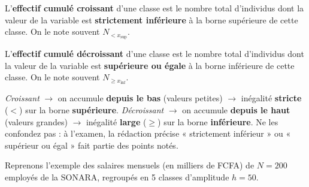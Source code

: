 \documentclass[11pt]{article}
\begin{document}
\begin{definition}
L'\textbf{effectif cumulé croissant} d'une classe est le nombre total d'individus dont la valeur de la variable est \textbf{strictement inférieure} à la borne supérieure de cette classe.
On le note souvent $N_{< x_{\text{sup}}}$.
\end{definition}

\begin{definition}
L'\textbf{effectif cumulé décroissant} d'une classe est le nombre total d'individus dont la valeur de la variable est \textbf{supérieure ou égale} à la borne inférieure de cette classe.
On le note souvent $N_{\ge x_{\text{inf}}}$.
\end{definition}

\begin{attention}
\emph{Croissant} $\rightarrow$ on accumule \textbf{depuis le bas} (valeurs petites) $\rightarrow$ inégalité \textbf{stricte} ($<$) sur la borne \textbf{supérieure}.
\emph{Décroissant} $\rightarrow$ on accumule \textbf{depuis le haut} (valeurs grandes) $\rightarrow$ inégalité \textbf{large} ($\ge$) sur la borne \textbf{inférieure}.
Ne les confondez pas : à l'examen, la rédaction précise « strictement inférieur » ou « supérieur ou égal » fait partie des points notés.
\end{attention}

Reprenons l'exemple des salaires mensuels (en milliers de FCFA) de $N=200$ employés de la SONARA, regroupés en 5 classes d'amplitude $h=50$.
\end{document}
